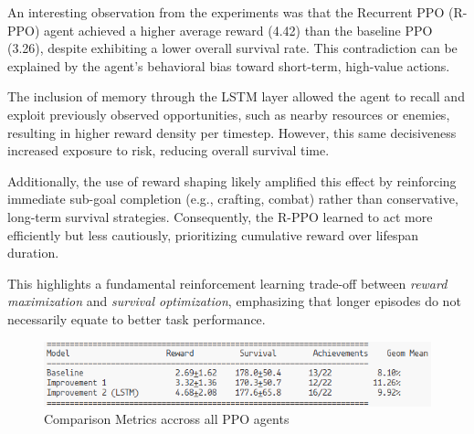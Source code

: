 \documentclass[twocolumn]{article}
\begin{document}
An interesting observation from the experiments was that the Recurrent PPO (R-PPO) agent achieved a higher average reward (4.42) than the baseline PPO (3.26), despite exhibiting a lower overall survival rate. This contradiction can be explained by the agent's behavioral bias toward short-term, high-value actions.

The inclusion of memory through the LSTM layer allowed the agent to recall and exploit previously observed opportunities, such as nearby resources or enemies, resulting in higher reward density per timestep. However, this same decisiveness increased exposure to risk, reducing overall survival time.

Additionally, the use of reward shaping likely amplified this effect by reinforcing immediate sub-goal completion (e.g., crafting, combat) rather than conservative, long-term survival strategies. Consequently, the R-PPO learned to act more efficiently but less cautiously, prioritizing cumulative reward over lifespan duration.

This highlights a fundamental reinforcement learning trade-off between \textit{reward maximization} and \textit{survival optimization}, emphasizing that longer episodes do not necessarily equate to better task performance.

\begin{figure}[H]
    \centering
    \includegraphics[width=0.75\linewidth]{images/ComparisonPPO.png}
    \caption{Comparison Metrics accross all PPO agents}
    \label{fig:placeholder}
\end{figure}
\end{document}
